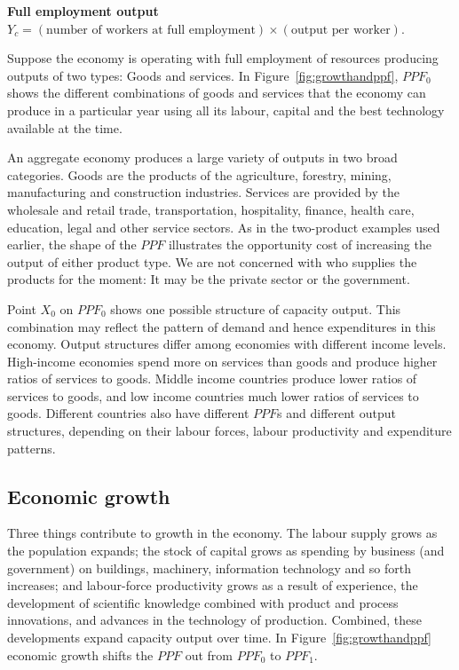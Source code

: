 \begin{DefBox}
	\textbf{Full employment output} $Y_c=(\text{number of workers at full employment})\times(\text{output per worker})$.
\end{DefBox}

\newhtmlpage

Suppose the economy is operating with full employment of resources producing
outputs of two types: Goods and services. In Figure~\ref{fig:growthandppf}, 
$PPF_{0}$ shows the different combinations of goods and services that the
economy can produce in a particular year using all its labour, capital and
the best technology available at the time.



\newhtmlpage

An aggregate economy produces a large variety of outputs in two broad
categories. Goods are the products of the agriculture, forestry, mining,
manufacturing and construction industries. Services are provided by the
wholesale and retail trade, transportation, hospitality, finance, health
care, education, legal and other service sectors. As in the two-product
examples used earlier, the shape of the $PPF$ illustrates the opportunity
cost of increasing the output of either product type. We are not concerned
with who supplies the products for the moment: It may be the private sector
or the government. 

Point $X_0$ on $PPF_0$ shows one possible structure of capacity output. This
combination may reflect the pattern of demand and hence expenditures in this
economy. Output structures differ among economies with different income
levels. High-income economies spend more on services than goods and produce
higher ratios of services to goods. Middle income countries produce lower
ratios of services to goods, and low income countries much lower ratios of
services to goods. Different countries also have different $PPF$s and
different output structures, depending on their labour forces, labour
productivity and expenditure patterns.

\subsection*{Economic growth}

Three things contribute to growth in the economy. The labour supply grows as
the population expands; the stock of capital grows as spending by business
(and government) on buildings, machinery, information technology and so
forth increases; and labour-force productivity grows as a result of experience, the
development of scientific knowledge combined with product and process
innovations, and advances in the technology of production. Combined, these
developments expand capacity output over time. In Figure~\ref{fig:growthandppf} 
economic growth shifts the $PPF$ out from $PPF_{0}$ to $PPF_{1}$.

